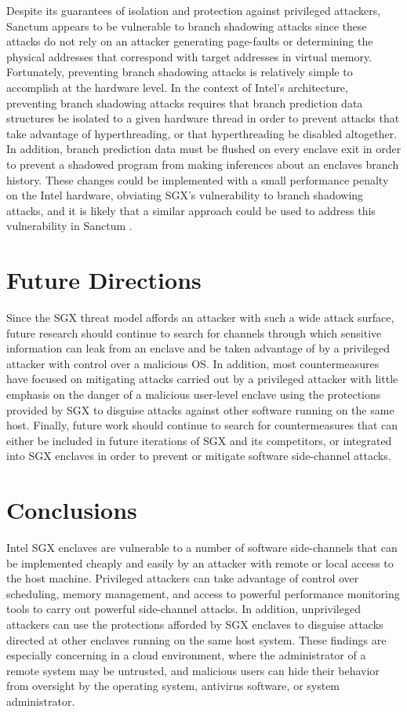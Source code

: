 Despite its guarantees of isolation and protection against privileged attackers, Sanctum appears to be vulnerable to branch shadowing attacks since these attacks do not rely on an attacker generating page-faults or determining the physical addresses that correspond with target addresses in virtual memory. Fortunately, preventing branch shadowing attacks is relatively simple to accomplish at the hardware level. In the context of Intel's architecture, preventing branch shadowing attacks requires that branch prediction data structures be isolated to a given hardware thread in order to prevent attacks that take advantage of hyperthreading, or that hyperthreading be disabled altogether. In addition, branch prediction data must be flushed on every enclave exit in order to prevent a shadowed program from making inferences about an enclaves branch history. These changes could be implemented with a small performance penalty on the Intel hardware, obviating SGX's vulnerability to branch shadowing attacks, and it is likely that a similar approach could be used to address this vulnerability in Sanctum \cite{costan_sanctum:_2016, costan_sanctum:_2015, lee_inferring_2017}.

\section{Future Directions}

Since the SGX threat model affords an attacker with such a wide attack surface, future research should continue to search for channels through which sensitive information can leak from an enclave and be taken advantage of by a privileged attacker with control over a malicious OS. In addition, most countermeasures have focused on mitigating attacks carried out by a privileged attacker with little emphasis on the danger of a malicious user-level enclave using the protections provided by SGX to disguise attacks against other software running on the same host. Finally, future work should continue to search for countermeasures that can either be included in future iterations of SGX and its competitors, or integrated into SGX enclaves in order to prevent or mitigate software side-channel attacks.

\section{Conclusions}

Intel SGX enclaves are vulnerable to a number of software side-channels that can be implemented cheaply and easily by an attacker with remote or local access to the host machine. Privileged attackers can take advantage of control over scheduling, memory management, and access to powerful performance monitoring tools to carry out powerful side-channel attacks. In addition, unprivileged attackers can use the protections afforded by SGX enclaves to disguise attacks directed at other enclaves running on the same host system. These findings are especially concerning in a cloud environment, where the administrator of a remote system may be untrusted, and malicious users can hide their behavior from oversight by the operating system, antivirus software, or system administrator. 

